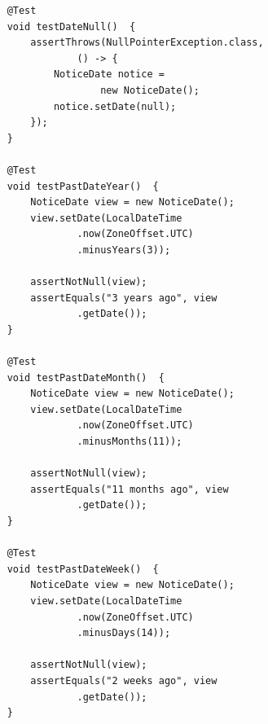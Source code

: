 \begin{listing}[!ht]
\begin{verbatim}
    @Test
    void testDateNull()  {
        assertThrows(NullPointerException.class,
                () -> {
            NoticeDate notice =
                    new NoticeDate();
            notice.setDate(null);
        });
    }

    @Test
    void testPastDateYear()  {
        NoticeDate view = new NoticeDate();
        view.setDate(LocalDateTime
                .now(ZoneOffset.UTC)
                .minusYears(3));

        assertNotNull(view);
        assertEquals("3 years ago", view
                .getDate());
    }

    @Test
    void testPastDateMonth()  {
        NoticeDate view = new NoticeDate();
        view.setDate(LocalDateTime
                .now(ZoneOffset.UTC)
                .minusMonths(11));

        assertNotNull(view);
        assertEquals("11 months ago", view
                .getDate());
    }

    @Test
    void testPastDateWeek()  {
        NoticeDate view = new NoticeDate();
        view.setDate(LocalDateTime
                .now(ZoneOffset.UTC)
                .minusDays(14));

        assertNotNull(view);
        assertEquals("2 weeks ago", view
                .getDate());
    }

\end{verbatim}
\end{listing}


